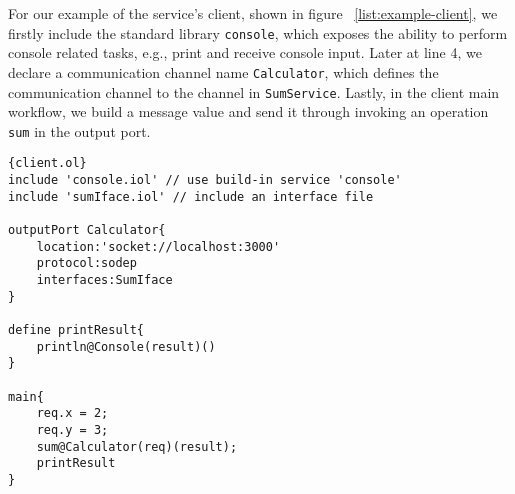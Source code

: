 For our example of the service's client, shown in figure ~\ref{list:example-client}, we firstly include the standard library \texttt{console}, which exposes the ability to perform console related tasks, e.g., print and receive console input. Later at line 4, we declare a communication channel name \texttt{Calculator}, which defines the communication channel to the channel in \texttt{SumService}. Lastly, in the client main workflow, we build a message value and send it through invoking an operation \texttt{sum} in the output port.

\begin{listing}[ht]
    \lstset{language=Jolie,
        style=codeStyle,
        numbers=left,
        firstnumber=1
    }
\begin{lstlisting}[frame=tlrb]{client.ol}
include 'console.iol' // use build-in service 'console'
include 'sumIface.iol' // include an interface file 

outputPort Calculator{
    location:'socket://localhost:3000'
    protocol:sodep 
    interfaces:SumIface
}

define printResult{
    println@Console(result)()
}

main{
    req.x = 2;
    req.y = 3;
    sum@Calculator(req)(result);
    printResult
}
\end{lstlisting}
\caption{Jolie implementation of the summation service's client}
\label{list:example-client}
\end{listing}

\FloatBarrier
